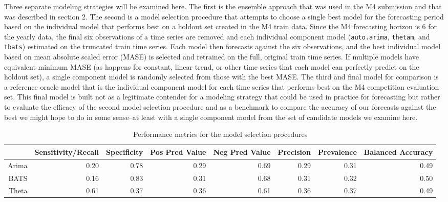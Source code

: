 \documentclass[11pt,3p,review,authoryear]{elsarticle}
\begin{document}
Three separate modeling strategies will be examined here. The first is the ensemble approach that was used in the M4 submission and that was described in section 2. The second is a model selection procedure that attempts to choose a single best model for the forecasting period based on the individual model that performs best on a holdout set created in the M4 train data. Since the M4 forecasting horizon is 6 for the yearly data, the final six observations of a time series are removed and each individual component model (\texttt{auto.arima}, \texttt{thetam}, and \texttt{tbats}) estimated on the truncated train time series. Each model then forecasts against the six observations, and the best individual model based on mean absolute scaled error (MASE) is selected and retrained on the full, original train time series. If multiple models have equivalent minimum MASE (as happens for constant, linear trend, or other time series that each model can perfectly predict on the holdout set), a single component model is randomly selected from those with the best MASE. The third and final model for comparison is a reference oracle model that is the individual component model for each time series that performs best on the M4 competition evaluation set. This final model is built not as a legitimate contender for a modeling strategy that could be used in practice for forecasting but rather to evaluate the efficacy of the second model selection procedure and as a benchmark to compare the accuracy of our forecasts against the best we might hope to do in some sense--at least with a single component model from the set of candidate models we examine here.

\begin{table}[ht]
\centering
\begin{adjustbox}{width=1\textwidth}
\begin{tabular}{rrrrrrrr}
  \hline
 & Sensitivity/Recall & Specificity & Pos Pred Value & Neg Pred Value & Precision & Prevalence & Balanced Accuracy \\ 
  \hline
Arima & 0.20 & 0.78 & 0.29 & 0.69 & 0.29 & 0.31 & 0.49 \\ 
  BATS & 0.16 & 0.83 & 0.31 & 0.68 & 0.31 & 0.32 & 0.50 \\ 
  Theta & 0.61 & 0.37 & 0.36 & 0.61 & 0.36 & 0.37 & 0.49 \\ 
   \hline
\end{tabular}
\end{adjustbox}
\caption{Performance metrics for the model selection procedures}\label{tab:a}
\end{table}
\end{document}

